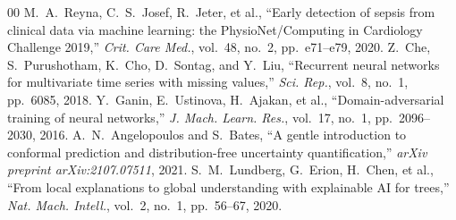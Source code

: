 \documentclass[conference]{IEEEtran}
\begin{document}
\begin{thebibliography}{00}
 M.~A.~Reyna, C.~S.~Josef, R.~Jeter, et al., ``Early detection of sepsis from clinical data via machine learning: the PhysioNet/Computing in Cardiology Challenge 2019,'' \textit{Crit. Care Med.}, vol.~48, no.~2, pp.~e71--e79, 2020.
 Z.~Che, S.~Purushotham, K.~Cho, D.~Sontag, and Y.~Liu, ``Recurrent neural networks for multivariate time series with missing values,'' \textit{Sci. Rep.}, vol.~8, no.~1, pp.~6085, 2018.
 Y.~Ganin, E.~Ustinova, H.~Ajakan, et al., ``Domain-adversarial training of neural networks,'' \textit{J. Mach. Learn. Res.}, vol.~17, no.~1, pp.~2096--2030, 2016.
 A.~N.~Angelopoulos and S.~Bates, ``A gentle introduction to conformal prediction and distribution-free uncertainty quantification,'' \textit{arXiv preprint arXiv:2107.07511}, 2021.
 S.~M.~Lundberg, G.~Erion, H.~Chen, et al., ``From local explanations to global understanding with explainable AI for trees,'' \textit{Nat. Mach. Intell.}, vol.~2, no.~1, pp.~56--67, 2020.
\end{thebibliography}
\end{document}
